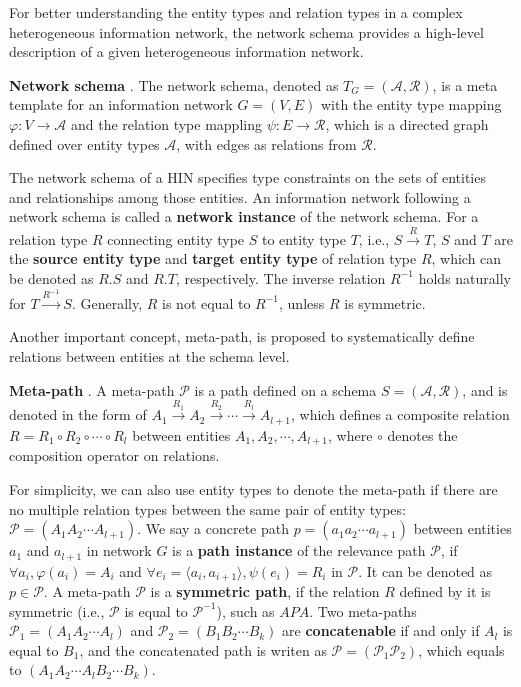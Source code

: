 \documentclass{acm_proc_article-csis8101}
\begin{document}
For better understanding the entity types and relation types in a complex heterogeneous information network, the network schema provides a high-level description of a given heterogeneous information network.

\begin{definition}
{\bf Network schema} \cite{sun2013mining,sun2009ranking}. The network schema, denoted as $T_{G}=(\mathcal{A},\mathcal{R})$, is a meta template for an information network $G=(V,E)$ with the entity type mapping $\varphi: V \rightarrow \mathcal{A}$ and the relation type mappling $\psi: E \rightarrow \mathcal{R}$, which is a directed graph defined over entity types $\mathcal{A}$, with edges as relations from $\mathcal{R}$.
\end{definition}

The network schema of a HIN specifies type constraints on the sets of entities and relationships among those entities. An information network following a network schema is called a {\bf network instance} of the network schema. For a relation type $R$ connecting entity type $S$ to entity type $T$, i.e., $S\xrightarrow{R} T$, $S$ and $T$ are the {\bf source entity type} and {\bf target entity type} of relation type $R$, which can be denoted as $R.S$ and $R.T$, respectively. The inverse relation $R^{-1}$ holds naturally for $T \xrightarrow{R^{-1}} S$. Generally, $R$ is not equal to $R^{-1}$, unless $R$ is symmetric.

Another important concept, meta-path, is proposed to systematically define relations between entities at the schema level.

\begin{definition}
{\bf Meta-path} \cite{sun2011pathsim}. A meta-path $\mathcal{P}$ is a path defined on a schema $S=(\mathcal{A}, \mathcal{R})$, and is denoted in the form of $A_{1}\xrightarrow{R_{1}}A_{2}\xrightarrow{R_{2}}\cdots \xrightarrow{R_{l}}A_{l+1}$, which defines a composite relation $R=R_{1}\circ R_{2}\circ \cdots \circ R_{l}$ between entities $A_{1}, A_{2}, \cdots, A_{l+1}$, where $\circ$ denotes the composition operator on relations.
\end{definition}

For simplicity, we can also use entity types to denote the meta-path if there are no multiple relation types between the same pair of entity types: $\mathcal{P}=(A_{1}A_{2}\cdots A_{l+1})$. We say a concrete path $p=(a_{1}a_{2}\cdots a_{l+1})$ between entities $a_{1}$ and $a_{l+1}$ in network $G$ is a {\bf path instance} of the relevance path $\mathcal{P}$, if $\forall a_{i}, \varphi(a_{i})=A_{i}$ and $\forall e_{i}= \langle a_{i}, a_{i+1} \rangle, \psi(e_{i})=R_{i}$ in $\mathcal{P}$. It can be denoted as $p \in \mathcal{P}$. A meta-path $\mathcal{P}$ is a {\bf symmetric path}, if the relation $R$ defined by it is symmetric (i.e., $\mathcal{P}$ is equal to $\mathcal{P}^{-1}$), such as $APA$. Two meta-paths $\mathcal{P}_{1}=(A_{1}A_{2}\cdots A_{l})$ and $\mathcal{P}_{2}=(B_{1}B_{2}\cdots B_{k})$ are {\bf concatenable} if and only if $A_{l}$ is equal to $B_{1}$, and the concatenated path is writen as $\mathcal{P}=(\mathcal{P}_{1}\mathcal{P}_{2})$, which equals to $(A_{1}A_{2}\cdots A_{l}B_{2}\cdots B_{k})$.
\end{document}
